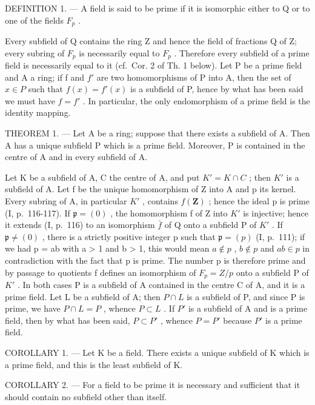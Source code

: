 DEFINITION 1. --- A field is said to be prime if it is isomorphic either to Q or to one of the fields \(F_{p}\) .

Every subfield of Q contains the ring Z and hence the field of fractions Q of Z; every subring of \(F_{p}\) is necessarily equal to \(F_{p}\) . Therefore every subfield of a prime field is necessarily equal to it (cf.~Cor. 2 of Th. 1 below). Let P be a prime field and A a ring; if f and \(f'\) are two homomorphisms of P into A, then the set of \(x \in P\) such that \(f(x) = f'(x)\) is a subfield of P, hence by what has been said we must have \(f = f'\) . In particular, the only endomorphism of a prime field is the identity mapping.

THEOREM 1. --- Let A be a ring; suppose that there exists a subfield of A. Then A has a unique subfield P which is a prime field. Moreover, P is contained in the centre of A and in every subfield of A.

Let K be a subfield of A, C the centre of A, and put \(K' = K \cap C\) ; then \(K'\) is a subfield of A. Let f be the unique homomorphism of Z into A and p its kernel. Every subring of A, in particular \(K'\) , contains \(f(\mathbf{Z})\) ; hence the ideal p is prime (I, p.~116-117). If \(\mathfrak{p} = (0)\) , the homomorphism f of Z into \(K'\) is injective; hence it extends (I, p.~116) to an isomorphism \(\bar{f}\) of Q onto a subfield P of \(K'\) . If \(\mathfrak{p} \neq (0)\) , there is a strictly positive integer p such that \(\mathfrak{p} = (p)\) (I, p.~111); if we had p = ab with a \textgreater{} 1 and b \textgreater{} 1, this would mean \(a \notin p\) , \(b \notin p\) and \(ab \in p\) in contradiction with the fact that p is prime. The number p is therefore prime and by passage to quotients f defines an isomorphism of \(F_p = Z/p\) onto a subfield P of \(K'\) . In both cases P is a subfield of A contained in the centre C of A, and it is a prime field. Let L be a subfield of A; then \(P \cap L\) is a subfield of P, and since P is prime, we have \(P \cap L = P\) , whence \(P \subset L\) . If \(P'\) is a subfield of A and is a prime field, then by what has been said, \(P \subset P'\) , whence \(P = P'\) because \(P'\) is a prime field.

COROLLARY 1. --- Let K be a field. There exists a unique subfield of K which is a prime field, and this is the least subfield of K.

COROLLARY 2. --- For a field to be prime it is necessary and sufficient that it should contain no subfield other than itself.

